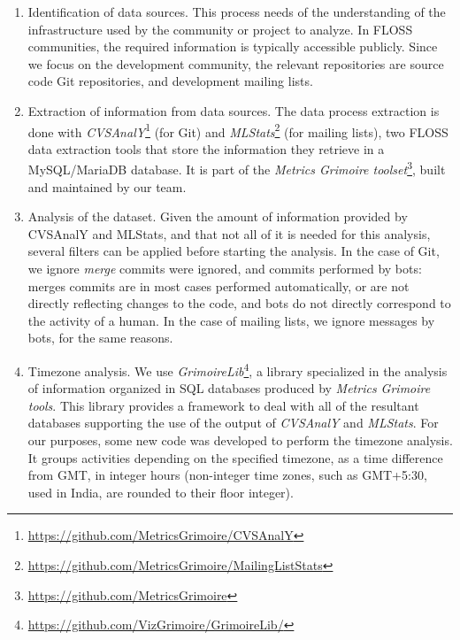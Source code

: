 \documentclass{sig-alternate-05-2015}
\begin{document}
\begin{enumerate}
\item Identification of data sources. This process needs of the understanding of the infrastructure used by the community or project to analyze. In FLOSS communities, the required information is typically accessible publicly. Since we focus on the development community, the relevant repositories are source code Git repositories, and development mailing lists.

\item Extraction of information from data sources. The data process extraction
is done with \emph{CVSAnalY}\footnote{\url{https://github.com/MetricsGrimoire/CVSAnalY}} (for Git) and \emph{MLStats}\footnote{\url{https://github.com/MetricsGrimoire/MailingListStats}} (for mailing lists), two FLOSS data extraction tools that store the information they retrieve in a MySQL/MariaDB database. It is part of the \emph{Metrics Grimoire toolset}\footnote{\url{https://github.com/MetricsGrimoire}}, built and maintained by our team.

\item Analysis of the dataset. Given the amount of information provided by CVSAnalY and MLStats, and that not all of it is needed for this analysis, several filters can be applied before starting the analysis. In the case of Git, we ignore \emph{merge} commits were ignored, and commits performed by bots: merges commits are in most cases performed automatically, or are not directly reflecting changes to the code, and bots do not directly correspond to the activity of a human. In the case of mailing lists, we ignore messages by bots, for the same reasons.

\item Timezone analysis. We use \emph{GrimoireLib}\footnote{\url{https://github.com/VizGrimoire/GrimoireLib/}}, a library specialized in the analysis of information organized in SQL databases produced by \emph{Metrics Grimoire tools}. This library provides a framework to deal with all of the resultant databases supporting the use of the output of \emph{CVSAnalY} and \emph{MLStats}. For our purposes, some new code was developed to perform the timezone analysis. It groups activities depending on the specified timezone, as a time difference from GMT, in integer hours (non-integer time zones, such as GMT+5:30, used in India, are rounded to their floor integer).

\end{enumerate}
\end{document}
